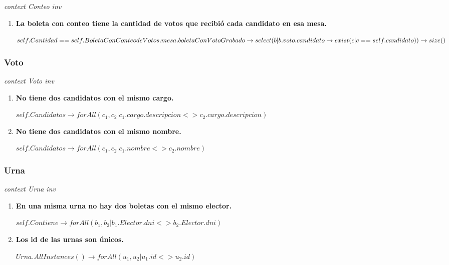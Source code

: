 \textit{context Conteo
inv}

\begin{enumerate}

\item \textbf{La boleta con conteo tiene la cantidad de votos que recibi\'o cada candidato en esa mesa.}

$self.Cantidad == \\
self.BoletaConConteodeVotos.mesa.boletaConVotoGrabado \rightarrow \\
select(b | b.voto.candidato  \rightarrow exist(c | c==self.candidato)) \rightarrow size() $

\end{enumerate}

\subsubsection*{Voto}

\textit{context Voto
inv}

\begin{enumerate}
\item \textbf{No tiene dos candidatos con el mismo cargo.}

$self.Candidatos  \rightarrow forAll(c_1, c_2 | c_1.cargo.descripcion <> c_2.cargo.descripcion)$

\item \textbf{No tiene dos candidatos con el mismo nombre.}

$self.Candidatos  \rightarrow forAll(c_1, c_2 | c_1.nombre <> c_2.nombre)$

\end{enumerate}

\subsubsection*{Urna}

\textit{context Urna
inv}

\begin{enumerate}

\item \textbf{En una misma urna no hay dos boletas con el mismo elector.}    

$self.Contiene \rightarrow forAll(b_1, b_2 | b_1.Elector.dni<>b_2.Elector.dni)$

\item \textbf{Los id de las urnas son únicos.}

$Urna.AllInstances() \rightarrow forAll(u_1, u_2|u_1.id<>u_2.id)$
\end{enumerate}

